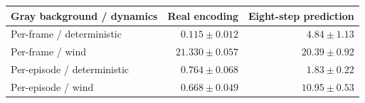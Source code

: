 \begin{tabular}{lrr}
\toprule
\rowcolor{Navy!8}
Gray background / dynamics & Real encoding & Eight-step prediction \\
\midrule
Per-frame / deterministic & $0.115\pm0.012$ & $4.84\pm1.13$ \\
\rowcolor{JEPA!10}
Per-frame / wind & $21.330\pm0.057$ & $20.39\pm0.92$ \\
Per-episode / deterministic & $0.764\pm0.068$ & $1.83\pm0.22$ \\
\rowcolor{Real!7}
Per-episode / wind & $0.668\pm0.049$ & $10.95\pm0.53$ \\
\bottomrule
\end{tabular}
